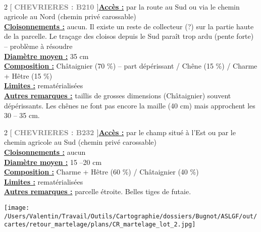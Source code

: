 \documentclass[a4paper,openany]{book}\usepackage[]{graphicx}\usepackage[]{color}
\begin{document}
\\\begin{multicols}{2}
[
\textbf{\textcolor{gray}{
\large CHEVRIERES : B210
}}
]\noindent\textbf{\underline{Accès :}} par la route au Sud ou via le chemin agricole au Nord (chemin privé carossable)\vspace{0.1cm} \\\noindent\textbf{\underline{Cloisonnements :}} aucun. Il existe un reste de collecteur (?)  sur la partie haute de la parcelle. Le traçage des cloisos depuis le Sud paraît trop ardu (pente forte) -- problème à résoudre\vspace{0.1cm} \\\noindent\textbf{\underline{Diamètre moyen :}} 35 cm\vspace{0.1cm} \\\noindent\textbf{\underline{Composition :}} Châtaignier (70 \%) -- part dépérissant / Chêne (15 \%) / Charme + Hêtre (15 \%)\vspace{0.1cm} \\\noindent\textbf{\underline{Limites :}} rematérialisées\vspace{0.1cm} \\\noindent\textbf{\underline{Autres remarques :}} taillis de grosses dimensions (Châtaignier) souvent dépérissants. Les chênes ne font pas encore la maille (40 cm) mais approchent les 30 -- 35 cm.\vspace{0.1cm} \\\end{multicols}\begin{multicols}{2}
[
\textbf{\textcolor{gray}{
\large CHEVRIERES : B232
}}
]\noindent\textbf{\underline{Accès :}} par le champ situé à l'Est ou par le chemin agricole au Sud (chemin privé carossable)\vspace{0.1cm} \\\noindent\textbf{\underline{Cloisonnements :}} aucun\vspace{0.1cm} \\\noindent\textbf{\underline{Diamètre moyen :}} 15 --20 cm\vspace{0.1cm} \\\noindent\textbf{\underline{Composition :}} Charme + Hêtre (60 \%) / Châtaignier (40 \%)\vspace{0.1cm} \\\noindent\textbf{\underline{Limites :}} rematérialisées\vspace{0.1cm} \\\noindent\textbf{\underline{Autres remarques :}} parcelle étroite. Belles tiges de futaie.\vspace{0.1cm} \\\end{multicols}\begin{center}
\texttt{[image: /Users/Valentin/Travail/Outils/Cartographie/dossiers/Bugnot/ASLGF/out/cartes/retour\_martelage/plans/CR\_martelage\_lot\_2.jpg]}
\end{center}\newpage\noindent
\end{document}
